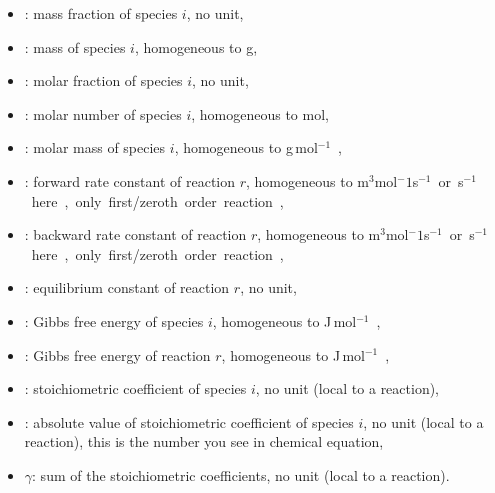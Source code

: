 \begin{itemize}
\item \massfrac[i]: mass fraction of species $i$, no unit,
\item \mass[i]: mass of species $i$, homogeneous to \unit{g},
\item \molarfrac[i]: molar fraction of species $i$, no unit,
\item \molar[i]: molar number of species $i$, homogeneous to \unit{mol},
\item \Mm[i]: molar mass of species $i$, homogeneous to \unit{g\,mol$^{-1}$},
\item \fwdrate[r]: forward rate constant of reaction $r$, homogeneous to \unit{m$^3$mol${^-1}$s$^{-1}$} or \unit{s$^{-1}$} here, 
                                                   only first/zeroth order reaction,
\item \bkwdrate[r]: backward rate constant of reaction $r$, homogeneous to \unit{m$^3$mol${^-1}$s$^{-1}$} or \unit{s$^{-1}$} here, 
                                                   only first/zeroth order reaction,
\item \Eqconst[r]: equilibrium constant of reaction $r$, no unit,
\item \gibbs[i]: Gibbs free energy of species $i$, homogeneous to \unit{J\,mol$^{-1}$},
\item \Dgibbs[r]: Gibbs free energy of reaction $r$, homogeneous to \unit{J\,mol$^{-1}$},
\item \scoef[i]: stoichiometric coefficient of species $i$, no unit (local to a reaction),
\item \scoefabs[i]: absolute value of stoichiometric coefficient of species $i$, no unit (local to a reaction), this is the number
        you see in chemical equation,
\item $\gamma$: sum of the stoichiometric coefficients, no unit (local to a reaction).
\end{itemize}

